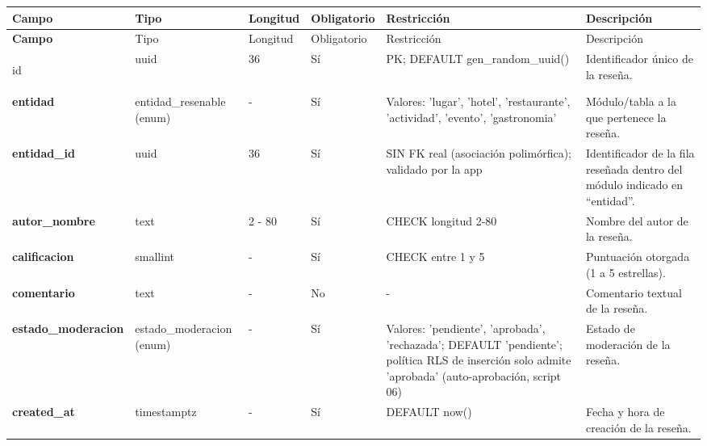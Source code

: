 {\footnotesize
\begin{longtable}{|>{\bfseries}p{3.3cm}|p{2.6cm}|p{1.2cm}|p{1.6cm}|p{2.8cm}|p{4.0cm}|}
\hline
Campo & Tipo & Longitud & Obligatorio & Restricción & Descripción \\ \hline
\endfirsthead
\hline
Campo & Tipo & Longitud & Obligatorio & Restricción & Descripción \\ \hline
\endhead
\hline
\endfoot
\hline
\endlastfoot

id & uuid & 36 & Sí & PK; DEFAULT gen\_random\_uuid() & Identificador único de la reseña. \\ \hline
entidad & entidad\_resenable (enum) & - & Sí & Valores: 'lugar', 'hotel', 'restaurante', 'actividad', 'evento', 'gastronomia' & Módulo/tabla a la que pertenece la reseña. \\ \hline
entidad\_id & uuid & 36 & Sí & SIN FK real (asociación polimórfica); validado por la app & Identificador de la fila reseñada dentro del módulo indicado en ``entidad''. \\ \hline
autor\_nombre & text & 2 - 80 & Sí & CHECK longitud 2-80 & Nombre del autor de la reseña. \\ \hline
calificacion & smallint & - & Sí & CHECK entre 1 y 5 & Puntuación otorgada (1 a 5 estrellas). \\ \hline
comentario & text & - & No & - & Comentario textual de la reseña. \\ \hline
estado\_moderacion & estado\_moderacion (enum) & - & Sí & Valores: 'pendiente', 'aprobada', 'rechazada'; DEFAULT 'pendiente'; política RLS de inserción solo admite 'aprobada' (auto-aprobación, script 06) & Estado de moderación de la reseña. \\ \hline
created\_at & timestamptz & - & Sí & DEFAULT now() & Fecha y hora de creación de la reseña. \\ \hline
\end{longtable}
}
